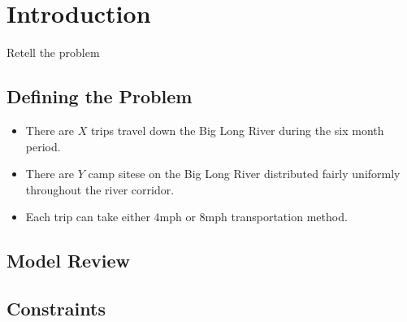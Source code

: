\section{Introduction}
Retell the problem

\subsection{Defining the Problem}
\begin{itemize}
\item There are $X$ trips travel down the Big Long River during the six month period. 
\item There are $Y$ camp sitese on the Big Long River distributed fairly uniformly throughout the river corridor. 
\item Each trip can take either $4 \text{mph}$ or $8 \text{mph}$ transportation method.
\end{itemize}

\subsection{Model Review}

\subsection{Constraints}
